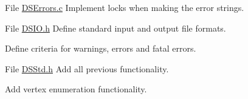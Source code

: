 \label{todo__todo000001}
\hypertarget{todo__todo000001}{}
 
\begin{DoxyDescription}
\item[File \hyperlink{_d_s_errors_8c}{DSErrors.c} ]Implement locks when making the error strings. 
\end{DoxyDescription}

\label{todo__todo000002}
\hypertarget{todo__todo000002}{}
 
\begin{DoxyDescription}
\item[File \hyperlink{_d_s_i_o_8h}{DSIO.h} ]Define standard input and output file formats. 

Define criteria for warnings, errors and fatal errors.


\end{DoxyDescription}

\label{todo__todo000003}
\hypertarget{todo__todo000003}{}
 
\begin{DoxyDescription}
\item[File \hyperlink{_d_s_std_8h}{DSStd.h} ]Add all previous functionality. 

Add vertex enumeration functionality.


\end{DoxyDescription}